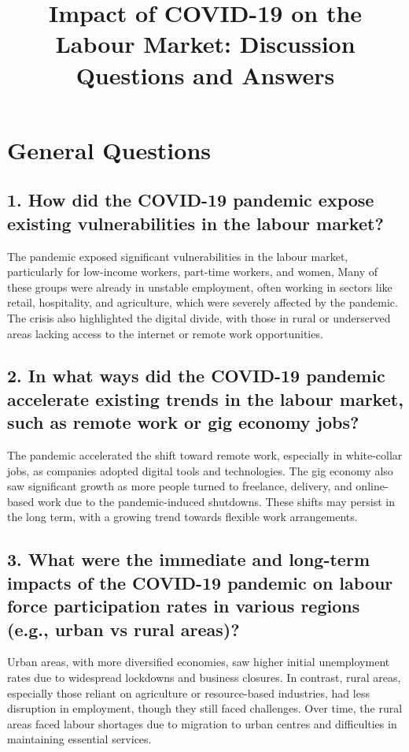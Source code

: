 \documentclass[12pt]{article}
\title{Impact of COVID-19 on the Labour Market: Discussion Questions and Answers}
\author{}
\date{}
\begin{document}
\maketitle

\section*{General Questions}

\subsection*{1. How did the COVID-19 pandemic expose existing vulnerabilities in the labour market?}
The pandemic exposed significant vulnerabilities in the labour market, particularly for low-income workers, part-time workers,  and women, Many of these groups were already in unstable employment, often working in sectors like retail, hospitality, and agriculture, which were severely affected by the pandemic. The crisis also highlighted the digital divide, with those in rural or underserved areas lacking access to the internet or remote work opportunities.

\subsection*{2. In what ways did the COVID-19 pandemic accelerate existing trends in the labour market, such as remote work or gig economy jobs?}
The pandemic accelerated the shift toward remote work, especially in white-collar jobs, as companies adopted digital tools and technologies. The gig economy also saw significant growth as more people turned to freelance, delivery, and online-based work due to the pandemic-induced shutdowns. These shifts may persist in the long term, with a growing trend towards flexible work arrangements.

\subsection*{3. What were the immediate and long-term impacts of the COVID-19 pandemic on labour force participation rates in various regions (e.g., urban vs rural areas)?}
Urban areas, with more diversified economies, saw higher initial unemployment rates due to widespread lockdowns and business closures. In contrast, rural areas, especially those reliant on agriculture or resource-based industries, had less disruption in employment, though they still faced challenges. Over time, the rural areas faced labour shortages due to migration to urban centres and difficulties in maintaining essential services.
\end{document}
